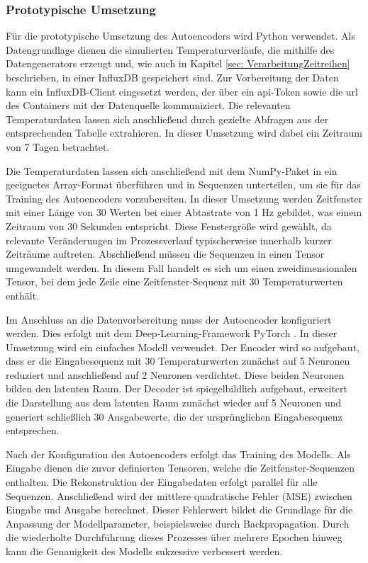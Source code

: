 \subsubsection{Prototypische Umsetzung}
Für die prototypische Umsetzung des Autoencoders wird Python verwendet.
Als Datengrundlage dienen die simulierten Temperaturverläufe, die mithilfe des Datengenerators erzeugt und, wie auch in Kapitel \ref{sec: VerarbeitungZeitreihen} beschrieben, in einer InfluxDB gespeichert sind.
Zur Vorbereitung der Daten kann ein InfluxDB-Client eingesetzt werden, der über ein \acs{api}-Token sowie die \acs{url} des Containers mit der Datenquelle kommuniziert.
Die relevanten Temperaturdaten lassen sich anschließend durch gezielte Abfragen aus der entsprechenden Tabelle extrahieren.
In dieser Umsetzung wird dabei ein Zeitraum von 7 Tagen betrachtet.

Die Temperaturdaten lassen sich anschließend mit dem NumPy-Paket in ein geeignetes Array-Format überführen und in Sequenzen unterteilen, um sie für das Training des Autoencoders vorzubereiten.
In dieser Umsetzung werden Zeitfenster mit einer Länge von 30 Werten bei einer Abtastrate von 1 Hz gebildet, was einem Zeitraum von 30 Sekunden entspricht.
Diese Fenstergröße wird gewählt, da relevante Veränderungen im Prozessverlauf typischerweise innerhalb kurzer Zeiträume auftreten.
Abschließend müssen die Sequenzen in einen Tensor umgewandelt werden. 
In diesem Fall handelt es sich um einen zweidimensionalen Tensor, bei dem jede Zeile eine Zeitfenster-Sequenz mit 30 Temperaturwerten enthält.

Im Anschluss an die Datenvorbereitung muss der Autoencoder konfiguriert werden. 
Dies erfolgt mit dem Deep-Learning-Framework PyTorch \cite{PyTorch}. 
In dieser Umsetzung wird ein einfaches Modell verwendet. 
Der Encoder wird so aufgebaut, dass er die Eingabesequenz mit 30 Temperaturwerten zunächst auf 5 Neuronen reduziert und anschließend auf 2 Neuronen verdichtet. 
Diese beiden Neuronen bilden den latenten Raum. 
Der Decoder ist spiegelbildlich aufgebaut, erweitert die Darstellung aus dem latenten Raum zunächst wieder auf 5 Neuronen und generiert schließlich 30 Ausgabewerte, die der ursprünglichen Eingabesequenz entsprechen.

Nach der Konfiguration des Autoencoders erfolgt das Training des Modells. 
Als Eingabe dienen die zuvor definierten Tensoren, welche die Zeitfenster-Sequenzen enthalten. 
Die Rekonstruktion der Eingabedaten erfolgt parallel für alle Sequenzen. 
Anschließend wird der mittlere quadratische Fehler (MSE) zwischen Eingabe und Ausgabe berechnet. 
Dieser Fehlerwert bildet die Grundlage für die Anpassung der Modellparameter, beispielsweise durch Backpropagation. 
Durch die wiederholte Durchführung dieses Prozesses über mehrere Epochen hinweg kann die Genauigkeit des Modells sukzessive verbessert werden.

